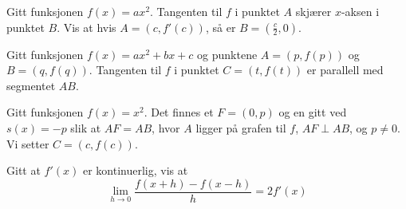Gitt funksjonen $f(x)=ax^2$. Tangenten til $f$ i punktet $A$ skjærer $x$-aksen i punktet $B$. Vis at hvis $A=(c, f'(c))$, så er $B=\left(\frac{c}{2}, 0\right)$.

Gitt funksjonen $f(x)=a x^2+b x + c$ og punktene $A=(p, f(p))$ og $B=(q, f(q))$. Tangenten til $f$ i punktet $C=(t, f(t))$ er parallell med segmentet $AB$. \os
{}






\newpage
{}
Gitt funksjonen $f(x)=x^2$. Det finnes et  $F=(0, p)$ og en  gitt ved $s(x)=-p$ slik at $AF=AB$, hvor $A$ ligger på grafen til $f$, $AF\perp AB$, og $p\neq0$.
Vi setter $C=(c, f(c))$.






Gitt at $ f'(x) $ er kontinuerlig, vis at
\[ \lim\limits_{h\to0}\frac{f(x+h)-f(x-h)}{h}=2f'(x) \]

